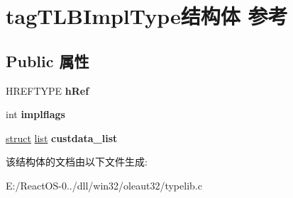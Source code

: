 \hypertarget{structtag_t_l_b_impl_type}{}\section{tag\+T\+L\+B\+Impl\+Type结构体 参考}
\label{structtag_t_l_b_impl_type}
\subsection*{Public 属性}
\begin{DoxyCompactItemize}
\item 
\mbox{\label{structtag_t_l_b_impl_type_a1783423a5182dade7c3aaeb2d3e1c7e6}} 
H\+R\+E\+F\+T\+Y\+PE {\bfseries h\+Ref}
\item 
\mbox{\label{structtag_t_l_b_impl_type_a349e91d8cf477454e613bf41a3e7dcfb}} 
int {\bfseries implflags}
\item 
\mbox{\label{structtag_t_l_b_impl_type_a31472407788667513f4c213de77feb41}} 
\hyperlink{interfacestruct}{struct} \hyperlink{classlist}{list} {\bfseries custdata\+\_\+list}
\end{DoxyCompactItemize}


该结构体的文档由以下文件生成\+:\begin{DoxyCompactItemize}
\item 
E\+:/\+React\+O\+S-\/0../dll/win32/oleaut32/typelib.\+c\end{DoxyCompactItemize}
